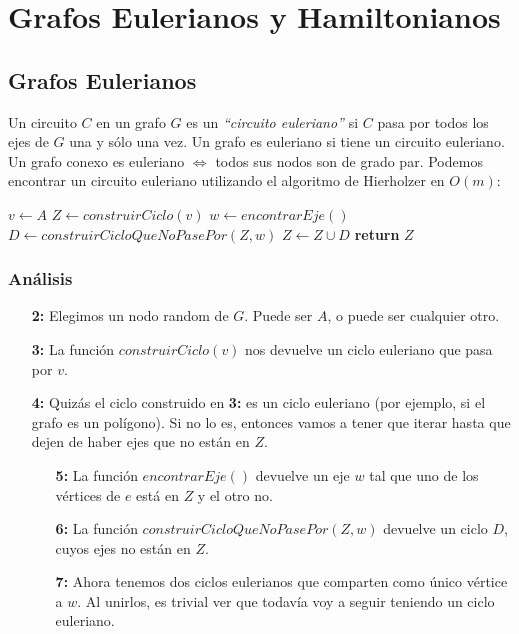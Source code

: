 \newpage
\section{Grafos Eulerianos y Hamiltonianos}

\subsection{Grafos Eulerianos}

Un circuito $C$ en un grafo $G$ es un \emph{``circuito euleriano''} si $C$ pasa por todos los ejes de $G$ una y s\'olo una vez. Un grafo es euleriano si tiene un circuito euleriano. Un grafo conexo es euleriano $\Leftrightarrow$ todos sus nodos son de grado par. Podemos encontrar un circuito euleriano utilizando el algoritmo de Hierholzer en $O(m)$: 

\begin{algorithm}
\begin{algorithmic}[1]
  \State $v \gets A$
  \State $Z \gets construirCiclo(v)$
    \State $w \gets encontrarEje()$
    \State $D \gets construirCicloQueNoPasePor(Z, w)$
    \State $Z \gets Z \cup D$
  \EndWhile
  \State \textbf{return} $Z$
\EndFunction
\end{algorithmic}
\end{algorithm}

\subsubsection*{An\'alisis}

\begin{enumerate}
  \item [\textbf{2:}] Elegimos un nodo random de $G$. Puede ser $A$, o puede ser cualquier otro.
  \item [\textbf{3:}] La funci\'on $construirCiclo(v)$ nos devuelve un ciclo euleriano que pasa por $v$.
  \item [\textbf{4:}] Quiz\'as el ciclo construido en \textbf{3:} es un ciclo euleriano (por ejemplo, si el grafo es un pol\'igono). Si no lo es, entonces vamos a tener que iterar hasta que dejen de haber ejes que no est\'an en $Z$.
  \begin{enumerate}
    \item [\textbf{5:}] La funci\'on $encontrarEje()$ devuelve un eje $w$ tal que uno de los v\'ertices de $e$ est\'a en $Z$ y el otro no.
    \item [\textbf{6:}] La funci\'on $construirCicloQueNoPasePor(Z, w)$ devuelve un ciclo $D$, cuyos ejes no est\'an en $Z$.
    \item [\textbf{7:}] Ahora tenemos dos ciclos eulerianos que comparten como \'unico v\'ertice a $w$. Al unirlos, es trivial ver que todav\'ia voy a seguir teniendo un ciclo euleriano.
  \end{enumerate}
\end{enumerate}


